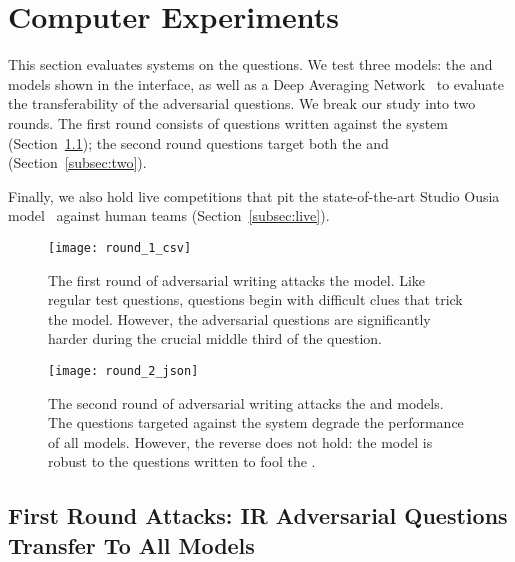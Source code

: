 \section{Computer Experiments}
\label{sec:experiments}

This section evaluates  systems on the \challenge{} questions. We
test three models: the  and  models shown in the interface, as well as a Deep Averaging Network~\cite[]{iyyer2015deep} to evaluate the transferability of the adversarial questions. We break our study into two rounds. The first round consists of \challenge{} questions written against
the  system (Section~\ref{subsec:one}); the second round questions target
both the  and  (Section~\ref{subsec:two}).

Finally, we also hold live competitions that pit the state-of-the-art Studio Ousia model~\cite{yamada2018studio} against human teams (Section~\ref{subsec:live}).

\begin{figure*}[t!]
\centering  
\texttt{[image: round\_1\_csv]}
\caption{The first round of adversarial writing attacks the  model. Like regular test
questions, \challenge{} questions begin with difficult clues that trick the model. However,
the adversarial questions are significantly harder during the crucial middle
third of the question.}
\label{fig:round_one}

\centering
\texttt{[image: round\_2\_json]}
\caption{The second round of adversarial writing attacks the  and  models. The questions targeted against the  system degrade the performance of all models. However, the reverse does not hold: the  model is robust to the questions written to fool the .}
\label{fig:round_two}
\end{figure*}

\subsection{First Round Attacks: IR Adversarial
Questions Transfer To All Models}\label{subsec:one}

